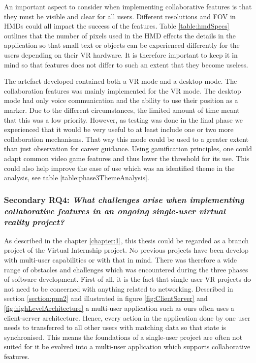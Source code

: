 An important aspect to consider when implementing collaborative features is that they must be visible and clear for all users. Different resolutions and FOV in HMDs could all impact the success of the features. Table \ref{table:hmdSpecs} outlines that the number of pixels used in the HMD effects the details in the application so that small text or objects can be experienced differently for the users depending on their VR hardware. It is therefore important to keep it in mind so that features does not differ to such an extent that they become useless.


The artefact developed contained both a VR mode and a desktop mode. The collaboration features was mainly implemented for the VR mode.   
The desktop mode had only voice communication and the ability to use their position as a marker. Due to the different circumstances, the limited amount of time meant that this was a low priority. However, as testing was done in the final phase we experienced that it would be very useful to at least include one or two more collaboration mechanisms. That way this mode could be used to a greater extent than just observation for career guidance. Using gamification principles, one could adapt common video game features and thus lower the threshold for its use. This could also help improve the ease of use which was an identified theme in the analysis, see table \ref{table:phase3ThemeAnalysis}.  




\subsubsection{Secondary RQ4: \textit{What challenges arise when implementing collaborative features in an ongoing
single-user virtual reality project?}} 

As described in the chapter \ref{chapter:1}, this thesis could be regarded as a branch project of the Virtual Internship project. No previous projects have been develop with multi-user capabilities or with that in mind. There was therefore a wide range of obstacles and challenges which was encountered during the three phases of software development. First of all, it is the fact that single-user VR projects do not need to be concerned with anything related to networking. Described in section \ref{section:pun2} and illustrated in figure \ref{fig:ClientServer} and \ref{fig:highLevelArchitecture} a multi-user application such as ours often uses a client-server architecture. Hence, every action in the application done by one user needs to transferred to all other users with matching data so that state is synchronised. This means the foundations of a single-user project are often not suited for it be evolved into a multi-user application which supports collaborative features.

